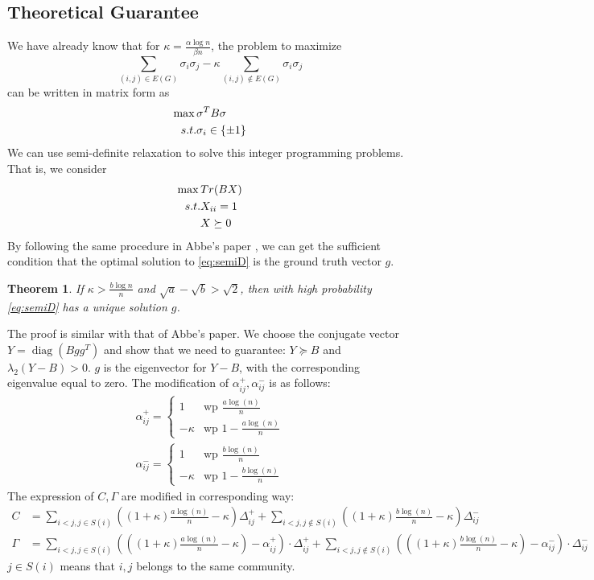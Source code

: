 \documentclass{article}
\newtheorem{theorem}{Theorem}
\DeclareMathOperator{\diag}{diag}
\newcommand{\A}{\frac{a \log(n)}{n}}
\newcommand{\B}{\frac{b \log(n)}{n}}
\begin{document}
\subsection{Theoretical Guarantee}
We have already know that for $\kappa = \frac{\alpha \log n}{\beta n}$, the problem to maximize
\begin{equation}
\sum_{(i,j)\in E(G)} \sigma_i \sigma_j - \kappa \sum_{(i,j) \not\in E(G)} \sigma_i \sigma_j
\end{equation}
can be written in matrix form
as 
\begin{align}
\max \, & \sigma^T B \sigma \label{eq:sigmaB}\\
s.t. & \sigma_i \in \{\pm 1\} \notag
\end{align}
We can use semi-definite relaxation to solve this integer programming problems.
That is, we consider
\begin{align}
\max \,& Tr(BX) \label{eq:semiD}\\
s.t. & X_{ii} = 1 \notag \\
&  X \succeq 0 \notag
\end{align}
By following the same procedure in Abbe's paper \cite{abbe2015exact}, we can get the sufficient condition that the optimal solution
to \eqref{eq:semiD} is the ground truth vector $g$.
\begin{theorem}
If $\kappa > \frac{b\log n}{n}$ and $\sqrt{a} - \sqrt{b} > \sqrt{2}$, then with high probability \eqref{eq:semiD} has a unique solution $g$.
\end{theorem}
The proof is similar with that of Abbe's paper. We choose the conjugate vector $Y=\diag(Bgg^T)$ and show that 
we need to guarantee:  $Y \succeq B$ and $\lambda_2(Y-B)>0$.
$g$ is the eigenvector for $Y-B$, with the corresponding eigenvalue equal to zero.
The modification of $\alpha_{ij}^+, \alpha_{ij}^-$ is as follows:
\begin{align}
\alpha^+_{ij}=\begin{cases} 1 & \text{wp }\A \\ -\kappa & \text{wp } 1-\A \end{cases}\\
\alpha^-_{ij}=\begin{cases} 1 & \text{wp }\B \\ -\kappa & \text{wp } 1-\B \end{cases}
\end{align}
The expression of $C, \Gamma$ are modified in corresponding way:
\begin{align}
C &=  \sum_{i<j, j \in S(i)}\left((1+\kappa)\A-\kappa\right)\Delta^+_{ij}+\sum_{i<j, j \notin S(i)} \left((1+\kappa)\B-\kappa\right) \Delta^-_{ij}\\
\Gamma &=  \sum_{i<j, j \in S(i)}\left(\left((1+\kappa)\A-\kappa\right) - \alpha^{+}_{ij}\right) \cdot \Delta^+_{ij} + \sum_{i<j, j \notin S(i)} \left(\left((1+\kappa)\B-\kappa\right) - \alpha^{-}_{ij}\right) \cdot \Delta^-_{ij}
\end{align}
$j\in S(i)$ means that $i,j$ belongs to the same community.
\end{document}
